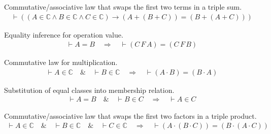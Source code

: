 \begin{lemma} Commutative/associative law that swaps the
first two terms in a triple
     sum. %
\begin{align}
\vdash ( ( A \in \mathbb{C} \wedge B \in \mathbb{C} \wedge C \in \mathbb{C} )
    \rightarrow ( A + ( B + C ) ) = ( B + ( A + C ) )
    )\label{eq:add12}\tag{add12}
\end{align}
\end{lemma}


\begin{lemma} Equality inference for operation value. 
\begin{align}
\vdash A = B\quad\Rightarrow\quad \vdash ( C \,F \,A ) = ( C \,F \,B
    )\label{eq:oveq2i}\tag{oveq2i}
\end{align}
\end{lemma}


\begin{lemma} Commutative law for multiplication. 
\begin{align}
\vdash A \in \mathbb{C}\quad\&\quad \vdash B \in
    \mathbb{C}\quad\Rightarrow\quad \vdash ( A \cdot B ) = ( B \cdot A
    )\label{eq:mulcomi}\tag{mulcomi}
\end{align}
\end{lemma}


\begin{lemma} Substitution of equal classes into
membership relation. %
\begin{align}
\vdash A = B\quad\&\quad \vdash B \in C\quad\Rightarrow\quad \vdash A \in
    C\label{eq:eqeltri}\tag{eqeltri}
\end{align}
\end{lemma}


\begin{lemma} Commutative/associative law that swaps the
first two factors in a triple
       product. %
\begin{align}
\vdash A \in \mathbb{C}\quad\&\quad \vdash B \in \mathbb{C}\quad\&\quad \vdash
    C \in \mathbb{C}\quad\Rightarrow\quad \vdash ( A \cdot ( B \cdot C ) ) = (
    B \cdot ( A \cdot C ) )\label{eq:mul12i}\tag{mul12i}
\end{align}
\end{lemma}


